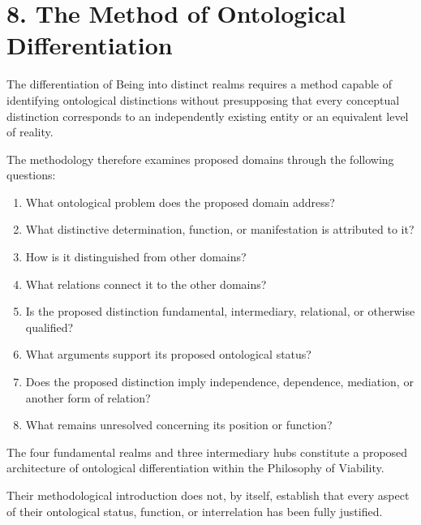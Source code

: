 \section*{8. The Method of Ontological Differentiation}

The differentiation of Being into
distinct realms requires a method
capable of identifying ontological
distinctions without presupposing
that every conceptual distinction
corresponds to an independently
existing entity or an equivalent
level of reality.

The methodology therefore examines
proposed domains through the following
questions:

\begin{enumerate}

    \item What ontological problem
    does the proposed domain address?

    \item What distinctive determination,
    function, or manifestation is
    attributed to it?

    \item How is it distinguished
    from other domains?

    \item What relations connect it
    to the other domains?

    \item Is the proposed distinction
    fundamental, intermediary,
    relational, or otherwise qualified?

    \item What arguments support
    its proposed ontological status?

    \item Does the proposed distinction
    imply independence, dependence,
    mediation, or another form
    of relation?

    \item What remains unresolved
    concerning its position or
    function?

\end{enumerate}

The four fundamental realms and
three intermediary hubs constitute
a proposed architecture of
ontological differentiation within
the Philosophy of Viability.

Their methodological introduction
does not, by itself, establish
that every aspect of their
ontological status, function,
or interrelation has been fully
justified.

